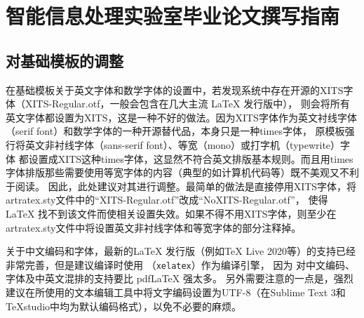 
\newcommand*{\ltxcmdname}[1]{\texttt{\textbackslash #1}}
\newcommand*{\ltxenvname}[1]{\texttt{#1}}
\newcommand*{\dif}{\mathop{}\!\mathrm{d}}
\newcommand*{\tc}[1]{\multicolumn{1}{c|}{#1}} %

\newcommand*{\figref}[1]{图~\ref{#1}~}
\newcommand*{\secref}[1]{~\ref{#1}~节}
\newcommand*{\tabref}[1]{表~\ref{#1}~}
\newcommand*{\algoref}[1]{算法~\ref{#1}~}
\newcommand*{\codref}[1]{程序~\ref{#1}~}
\newcommand*{\thmref}[1]{定理~\ref{#1}~}
\newcommand*{\axmref}[1]{公理~\ref{#1}~}
\newcommand*{\lemref}[1]{引理~\ref{#1}~}
\newcommand*{\prpref}[1]{命题~\ref{#1}~}
\newcommand*{\defref}[1]{定义~\ref{#1}~}

\newcommand*{\ntcite}[1]{~\cite{#1}~}
\newcommand*{\npcite}[1]{\textsuperscript{\cite{#1}}}

\chapter{智能信息处理实验室毕业论文撰写指南}

\section{对基础模板的调整}

在基础模板关于英文字体和数学字体的设置中，若发现系统中存在开源的XITS字体（XITS-Regular.otf，一般会包含在几大主流 \LaTeX{} 发行版中），
则会将所有英文字体都设置为XITS，这是一种不好的做法。因为XITS字体作为英文衬线字体（serif font）和数学字体的一种开源替代品，本身只是一种times字体，
原模板强行将英文非衬线字体（sans-serif font）、等宽（mono）或打字机（typewrite）字体
都设置成XITS这种times字体，这显然不符合英文排版基本规则。而且用times字体排版那些需要使用等宽字体的内容（典型的如计算机代码等）既不美观又不利于阅读。
因此，此处建议对其进行调整。最简单的做法是直接停用XITS字体，将artratex.sty文件中的“XITS-Regular.otf”改成“NoXITS-Regular.otf”，
使得 \LaTeX{} 找不到该文件而使相关设置失效。如果不得不用XITS字体，则至少在artratex.sty文件中将设置英文非衬线字体和等宽字体的部分注释掉。

关于中文编码和字体，最新的\LaTeX{} 发行版（例如TeX Live 2020等）的支持已经非常完善，但是建议编译时使用 \XeLaTeX{} （\texttt{xelatex}）作为编译引擎，
因为 \XeLaTeX{} 对中文编码、字体及中英文混排的支持要比 pdfLaTeX 强太多。
另外需要注意的一点是，强烈建议在所使用的文本编辑工具中将文字编码设置为UTF-8（在Sublime Text 3和TeXstudio中均为默认编码格式），以免不必要的麻烦。


